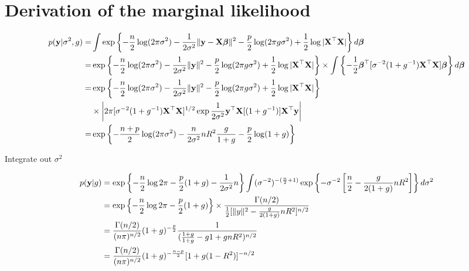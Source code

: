 \documentclass{amsart}[12pt]
\begin{document}
\section{Derivation of the marginal likelihood}
\begin{align*}
	p({\bf y}|\sigma^2, g) = & \int \exp \left \{ -\frac{n}{2} \log(2 \pi \sigma^2)                                                                                                               
	- \frac{1}{2 \sigma^2} \|{\bf y} - {\bf X} {\boldsymbol \beta}\|^2
	- \frac{p}{2} \log(2 \pi g \sigma^2) + \frac{1}{2} \log |{\bf X}^\top {\bf X}| \right \} d {\boldsymbol \beta} \\
	=                    & \exp \left \{ -\frac{n}{2} \log(2 \pi \sigma^2)  - \frac{1}{2 \sigma^2} \|{\bf y}\|^2 - \frac{p}{2} \log(2 \pi g \sigma^2) + \frac{1}{2} \log |{\bf X}^\top {\bf X}| \right \} 
	\times \int \left \{ -\frac{1}{2} {\boldsymbol \beta}^\top [\sigma^{-2} (1 + g^{-1}) {\bf X}^\top {\bf X}] {\boldsymbol\beta} \right \} d {\boldsymbol \beta} \\
	=                    & \exp \left \{ -\frac{n}{2} \log(2 \pi \sigma^2)  - \frac{1}{2 \sigma^2} \|{\bf y}\|^2 - \frac{p}{2} \log(2 \pi g \sigma^2) + \frac{1}{2} \log |{\bf X}^\top {\bf X}| \right \} \\
	                     & \times \left |2 \pi [\sigma^{-2}(1 + g^{-1}) {\bf X}^\top {\bf X}]^{1/2}                                                                                                   
	\exp{\frac{1}{2 \sigma^2} {\bf y}^\top {\bf X}[(1 + g^{-1})] {\bf X}^\top {\bf y}} \right | \\
	=                    & \exp \left \{ -\frac{n+p}{2} \log(2 \pi \sigma^2) - \frac{n}{2 \sigma^2} n R^2 \frac{g}{1 + g} - \frac{p}{2} \log(1 + g) \right \}                                 
\end{align*}

Integrate out $\sigma^2$

\begin{align*}
	p({\bf y} | g) & = \exp \left \{ -\frac{n}{2} \log 2 \pi - \frac{p}{2} (1 + g) - \frac{1}{2 \sigma^2} n  \right \}                   
	\int (\sigma^{-2})^{-(\frac{n}{2} + 1)} \exp \left \{- \sigma^{-2} \left[ \frac{n}{2} - \frac{g}{2(1 + g)} n R^2 \right]\right \} d \sigma^2 \\
	           & = \exp \left \{ -\frac{n}{2} \log 2 \pi - \frac{p}{2} (1 + g) \right \}                                             
	\times \frac{\Gamma(n/2)}{\frac{1}{2}[\|y\|^2 - \frac{g}{2(1 + g)} n R^2]^{n/2}} \\
	           & = \frac{\Gamma(n/2)}{(n \pi)^{n/2}} (1 + g)^{-\frac{p}{2}} \frac{1}{(\frac{1 + g}{1 + g} - {g}{1 + g} n R^2)^{n/2}} \\
	           & = \frac{\Gamma(n/2)}{(n \pi)^{n/2}} (1 + g)^{-\frac{n - p}{2}} [1 + g(1 - R^2)]^{-n/2}                              \\
\end{align*}
\end{document}
